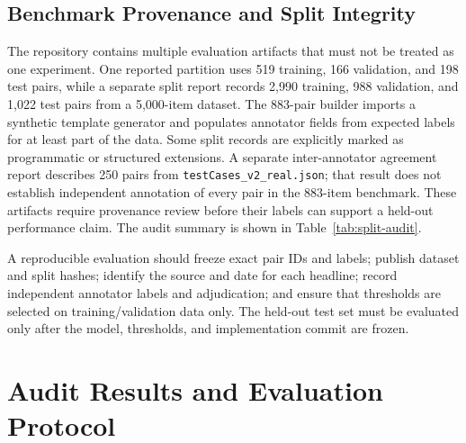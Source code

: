 \documentclass[sigconf,natbib=true,anonymous=true]{acmart}
\begin{document}
\subsection{Benchmark Provenance and Split Integrity}
The repository contains multiple evaluation artifacts that must not be treated as one experiment. One reported partition uses 519 training, 166 validation, and 198 test pairs, while a separate split report records 2,990 training, 988 validation, and 1,022 test pairs from a 5,000-item dataset. The 883-pair builder imports a synthetic template generator and populates annotator fields from expected labels for at least part of the data. Some split records are explicitly marked as programmatic or structured extensions. A separate inter-annotator agreement report describes 250 pairs from \texttt{testCases\_v2\_real.json}; that result does not establish independent annotation of every pair in the 883-item benchmark. These artifacts require provenance review before their labels can support a held-out performance claim. The audit summary is shown in Table~\ref{tab:split-audit}.

\begin{table}[!t]
\centering
\caption{Repository Audit of the 5,000-Record Dataset}
\label{tab:split-audit}
\end{table}

A reproducible evaluation should freeze exact pair IDs and labels; publish dataset and split hashes; identify the source and date for each headline; record independent annotator labels and adjudication; and ensure that thresholds are selected on training/validation data only. The held-out test set must be evaluated only after the model, thresholds, and implementation commit are frozen.

\section{Audit Results and Evaluation Protocol}
\end{document}
